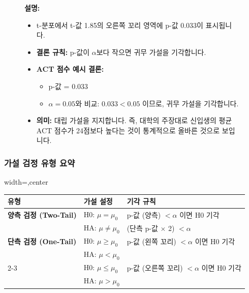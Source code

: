 \documentclass[11pt,a4paper]{article}
\theoremstyle{definition}
\begin{document}
\begin{figure}[h!]
    \centering
    \label{fig:one_tail_right_p_value}
    \vspace{0.5em}
    \textbf{설명:}
    \begin{itemize}
        \item t-분포에서 t-값 1.85의 오른쪽 꼬리 영역에 p-값 0.033이 표시됩니다.
        \item \textbf{결론 규칙:} p-값이 $\alpha$보다 작으면 귀무 가설을 기각합니다.
        \item \textbf{ACT 점수 예시 결론:}
            \begin{itemize}
                \item p-값 = 0.033
                \item $\alpha = 0.05$와 비교: $0.033 < 0.05$ 이므로, 귀무 가설을 기각합니다.
            \end{itemize}
        \item \textbf{의미:} 대립 가설을 지지합니다. 즉, 대학의 주장대로 신입생의 평균 ACT 점수가 24점보다 높다는 것이 통계적으로 올바른 것으로 보입니다.
    \end{itemize}
\end{figure}

\subsubsection*{가설 검정 유형 요약}

\begin{adjustbox}{width=\textwidth,center}
\begin{tabular}{lll}
\toprule
\textbf{유형} & \textbf{가설 설정} & \textbf{기각 규칙} \\
\midrule
\textbf{양측 검정 (Two-Tail)} & H0: $\mu = \mu_0$ & p-값 (양측) $< \alpha$ 이면 H0 기각 \\
& HA: $\mu \ne \mu_0$ & (단측 p-값 $\times$ 2) $< \alpha$ \\
\midrule
\textbf{단측 검정 (One-Tail)} & H0: $\mu \ge \mu_0$ & p-값 (왼쪽 꼬리) $< \alpha$ 이면 H0 기각 \\
& HA: $\mu < \mu_0$ & \\
\cmidrule{2-3}
& H0: $\mu \le \mu_0$ & p-값 (오른쪽 꼬리) $< \alpha$ 이면 H0 기각 \\
& HA: $\mu > \mu_0$ & \\
\bottomrule
\end{tabular}
\end{adjustbox}
\label{tab:hypothesis_summary}
\end{document}
